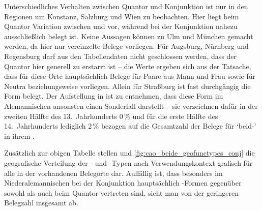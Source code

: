 Unterschiedliches Verhalten zwischen Quantor und Konjunktion ist nur in den
Regionen um Konstanz, Salzburg und Wien zu beobachten. Hier liegt beim Quantor
Variation zwischen  und  vor, während bei der
Konjunktion nahezu ausschließlich  belegt ist. Keine Aussagen
können zu Ulm und München gemacht werden, da hier nur vereinzelte Belege
vorliegen. Für Augsburg, Nürnberg und Regensburg darf aus den Tabellendaten
nicht geschlossen werden, dass der Quantor hier generell zu 
erstarrt ist -- die Werte ergeben sich aus der Tatsache, dass für diese Orte
hauptsächlich Belege für Paare aus Mann und Frau sowie für Neutra
beziehungsweise  vorliegen. Allein für Straßburg ist fast
durchgängig die Form  belegt. Der Aufstellung in \citet[621,
Abbildung P~177]{ksw2} ist zu entnehmen, dass diese Form im
Alemannischen ansonsten einen Sonderfall darstellt -- sie
verzeichnen dafür in der zweiten Hälfte des 13.~Jahrhunderts 0\,\% und für die
erste Hälfte des 14.~Jahrhunderts lediglich 2\,\% bezogen auf die Gesamtzahl
der Belege für  `beid-' in ihrem .

Zusätzlich zur obigen Tabelle stellen 
und \ref{fig:cao_beide_geofunctypes_conj} die geografische
Verteilung der - und
-Typen nach Verwendungskontext grafisch für alle in der
 vorhandenen Belegorte dar. Auffällig ist, dass besonders im
Nieder\-alemannischen bei der Konjunktion hauptsächlich
-Formen gegenüber sowohl  als auch  beim
Quantor vertreten sind, sieht man von der geringeren Belegzahl insgesamt ab.

